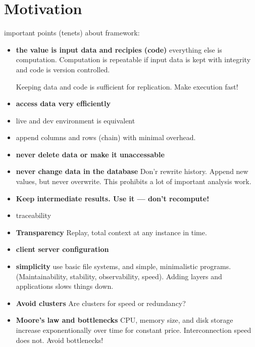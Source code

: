 \documentclass[a4paper]{report}
\begin{document}
\chapter{Motivation}
important points (tenets) about framework:
\begin{itemize}

\item \textbf{the value is input data and recipies (code)} everything
  else is computation.  Computation is repeatable if input data is
  kept with integrity and code is version controlled.

  Keeping data and code is
  sufficient for replication.  Make execution fast!

\item \textbf{access data very efficiently}

\item live and dev environment is equivalent

\item append columns and rows (chain) with minimal overhead.
  
\item \textbf{never delete data or make it unaccessable}

\item \textbf{never change data in the database} Don'r rewrite
  history.  Append new values, but never overwrite.  This prohibits a
  lot of important analysis work.
  
\item \textbf{Keep intermediate results.  Use it --- don't recompute!}

\item traceability
  
\item \textbf{Transparency} Replay, total context at any instance in
  time.

  
\item \textbf{client server configuration}
\item \textbf{simplicity} use basic file systems, and simple,
  minimalistic programs.  (Maintainability, stability, observability,
  speed).  Adding layers and applications slows things down.

\item \textbf{Avoid clusters}  Are clusters for speed or redundancy?
\item \textbf{Moore's law and bottlenecks} CPU, memory size, and disk
  storage increase exponentionally over time for constant price.
  Interconnection speed does not.  Avoid bottlenecks!
\end{itemize}
\end{document}
